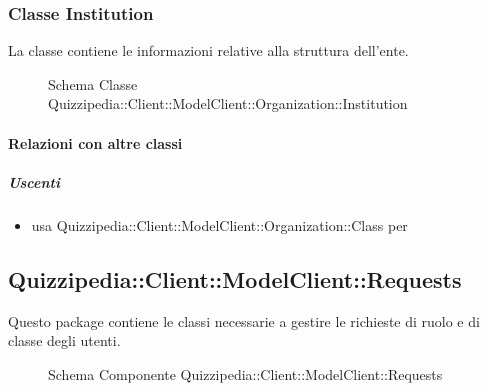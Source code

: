 \subsubsection{Classe Institution}
La classe contiene le informazioni relative alla struttura dell'ente.
\begin{figure}[H]
\centering
\noindent{}
\caption[Schema Classe Institution]{Schema Classe Quizzipedia::Client::ModelClient::Organization::Institution}
\end{figure}
\paragraph{Relazioni con altre classi}
\subparagraph{Uscenti}
\begin{itemize}
\item usa Quizzipedia::Client::ModelClient::Organization::Class per 
\end{itemize}
\subsection{Quizzipedia::Client::ModelClient::Requests}
Questo package contiene le classi necessarie a gestire le richieste di ruolo e di classe degli utenti.
\begin{figure}[H]
\centering
\noindent{}
\caption[Schema Componente Quizzipedia::Client::ModelClient::Requests]{Schema Componente Quizzipedia::Client::ModelClient::Requests}
\end{figure}
